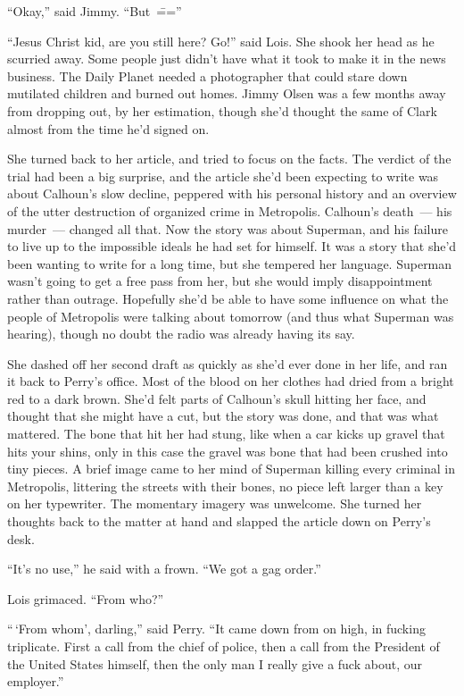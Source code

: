 \documentclass[ebook,12pt]{memoir}
\begin{document}
``Okay,'' said Jimmy. ``But~\===''

``Jesus Christ kid, are you still here? Go!'' said Lois. She shook her
head as he scurried away. Some people just didn't have what it took to
make it in the news business. The Daily Planet needed a photographer
that could stare down mutilated children and burned out homes. Jimmy
Olsen was a few months away from dropping out, by her estimation, though
she'd thought the same of Clark almost from the time he'd signed on.

She turned back to her article, and tried to focus on the facts. The
verdict of the trial had been a big surprise, and the article she'd been
expecting to write was about Calhoun's slow decline, peppered with his
personal history and an overview of the utter destruction of organized
crime in Metropolis. Calhoun's death~--- his murder~--- changed all
that. Now the story was about Superman, and his failure to live up to
the impossible ideals he had set for himself. It was a story that she'd
been wanting to write for a long time, but she tempered her language.
Superman wasn't going to get a free pass from her, but she would imply
disappointment rather than outrage. Hopefully she'd be able to have some
influence on what the people of Metropolis were talking about tomorrow
(and thus what Superman was hearing), though no doubt the radio was
already having its say.

She dashed off her second draft as quickly as she'd ever done in her
life, and ran it back to Perry's office. Most of the blood on her
clothes had dried from a bright red to a dark brown. She'd felt parts of
Calhoun's skull hitting her face, and thought that she might have a cut,
but the story was done, and that was what mattered. The bone that hit
her had stung, like when a car kicks up gravel that hits your shins,
only in this case the gravel was bone that had been crushed into tiny
pieces. A brief image came to her mind of Superman killing every
criminal in Metropolis, littering the streets with their bones, no piece
left larger than a key on her typewriter. The momentary imagery was
unwelcome. She turned her thoughts back to the matter at hand and
slapped the article down on Perry's desk.

``It's no use,'' he said with a frown. ``We got a gag order.''

Lois grimaced. ``From who?''

``\,`From whom', darling,'' said Perry. ``It came down from on high, in
fucking triplicate. First a call from the chief of police, then a call
from the President of the United States himself, then the only man I
really give a fuck about, our employer.''
\end{document}
